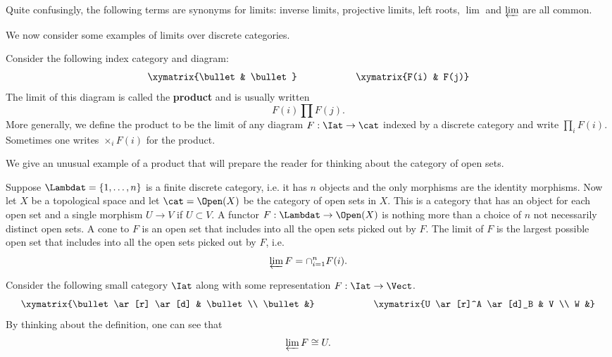 \begin{rmk}[Glossary]
	Quite confusingly, the following terms are synonyms for limits: inverse limits, projective limits, left roots, $\lim$ and $\varprojlim$ are all common.
\end{rmk}

We now consider some examples of limits over discrete categories.

\begin{ex}[Products]\label{ex:products}
	Consider the following index category and diagram:
	\[
		\xymatrix{\bullet & \bullet} \qquad \qquad \qquad \xymatrix{F(i) & F(j)}
	\]
	The limit of this diagram is called the \textbf{product} and is usually written
	\[
		F(i) \prod F(j).
	\]
	More generally, we define the product to be the limit of any diagram $F:\Iat\to\cat$ indexed by a discrete category and write $\prod_i F(i)$. Sometimes one writes $\times_i F(i)$ for the product.
\end{ex}

We give an unusual example of a product that will prepare the reader for thinking about the category of open sets.

\begin{ex}
	Suppose $\Lambdat=\{1,\ldots, n\}$ is a finite discrete category, i.e. it has $n$ objects and the only morphisms are the identity morphisms. Now let $X$ be a topological space and let $\cat=\Open(X)$ be the category of open sets in $X$. This is a category that has an object for each open set and a single morphism $U\to V$ if $U\subset V$. A functor $F:\Lambdat\to\Open(X)$ is nothing more than a choice of $n$ not necessarily distinct open sets. A cone to $F$ is an open set that includes into all the open sets picked out by $F$. The limit of $F$ is the largest possible open set that includes into all the open sets picked out by $F$, i.e. $$\varprojlim F=\cap_{i=1}^n F(i).$$
\end{ex}

\begin{ex}
	Consider the following small category $\Iat$ along with some representation $F:\Iat\to\Vect$.
	\[
	\xymatrix{\bullet \ar[r] \ar[d] & \bullet \\ \bullet &} \qquad \qquad \qquad
	\xymatrix{U \ar[r]^A \ar[d]_B & V \\ W &}
	\]
	By thinking about the definition, one can see that
	\[
		\varprojlim F\cong U.
	\]
\end{ex}


